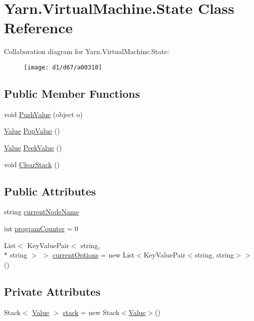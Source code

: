 \hypertarget{a00075}{\section{Yarn.\-Virtual\-Machine.\-State Class Reference}
\label{a00075}
}


Collaboration diagram for Yarn.\-Virtual\-Machine.\-State\-:
\nopagebreak
\begin{figure}[H]
\begin{center}
\leavevmode
\texttt{[image: d1/d67/a00310]}
\end{center}
\end{figure}
\subsection*{Public Member Functions}
\begin{DoxyCompactItemize}
\item 
void \hyperlink{a00075_aace44f5b85b9f746fede834becda4a8e}{Push\-Value} (object o)
\item 
\hyperlink{a00086}{Value} \hyperlink{a00075_a36881a888ea2839d74c3d4e7c199f4ee}{Pop\-Value} ()
\item 
\hyperlink{a00086}{Value} \hyperlink{a00075_a54fd5b64ec94e937e771846167242dc2}{Peek\-Value} ()
\item 
void \hyperlink{a00075_a9c787097fbbbbf1680e4960cda092535}{Clear\-Stack} ()
\end{DoxyCompactItemize}
\subsection*{Public Attributes}
\begin{DoxyCompactItemize}
\item 
string \hyperlink{a00075_a86f481fad527f719b49f8fee6ff79764}{current\-Node\-Name}
\item 
int \hyperlink{a00075_a2c76546b54b4fb573d7f14d79ce230a3}{program\-Counter} = 0
\item 
List$<$ Key\-Value\-Pair$<$ string, \\*
string $>$ $>$ \hyperlink{a00075_ab816dfea32ecda23282700f01454e0a9}{current\-Options} = new List$<$Key\-Value\-Pair$<$string, string$>$$>$()
\end{DoxyCompactItemize}
\subsection*{Private Attributes}
\begin{DoxyCompactItemize}
\item 
Stack$<$ \hyperlink{a00086}{Value} $>$ \hyperlink{a00075_a0bc84abf38b3ff31cbb47363b851c233}{stack} = new Stack$<$\hyperlink{a00086}{Value}$>$()
\end{DoxyCompactItemize}


